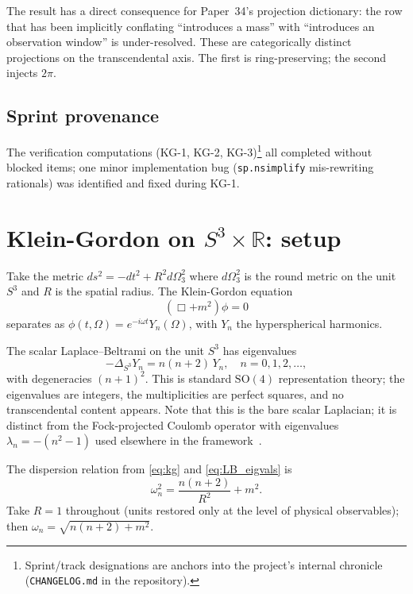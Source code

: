 \documentclass[11pt]{article}
\begin{document}
The result has a direct consequence for Paper~34's projection
dictionary: the row that has been implicitly conflating ``introduces a
mass'' with ``introduces an observation window'' is under-resolved.
These are categorically distinct projections on the transcendental
axis.  The first is ring-preserving; the second injects $2\pi$.

\subsection*{Sprint provenance}
The verification computations (KG-1, KG-2,
KG-3)\footnote{Sprint/track designations are anchors into the
project's internal chronicle (\texttt{CHANGELOG.md} in the
repository).} all completed without
blocked items; one minor implementation bug (\texttt{sp.nsimplify}
mis-rewriting rationals) was identified and fixed during KG-1.

\section{Klein-Gordon on $S^3 \times \mathbb{R}$: setup}
\label{sec:setup}

Take the metric $ds^2 = -dt^2 + R^2 d\Omega^2_3$ where $d\Omega^2_3$
is the round metric on the unit $S^3$ and $R$ is the spatial radius.
The Klein-Gordon equation
\begin{equation}
\label{eq:kg}
(\Box + m^2)\phi = 0
\end{equation}
separates as $\phi(t, \Omega) = e^{-i\omega t} Y_n(\Omega)$, with
$Y_n$ the hyperspherical harmonics.

The scalar Laplace--Beltrami on the unit $S^3$ has eigenvalues
\begin{equation}
\label{eq:LB_eigvals}
-\Delta_{S^3} Y_n = n(n+2) \, Y_n,
\quad n = 0, 1, 2, \ldots,
\end{equation}
with degeneracies $(n+1)^2$.  This is standard $\mathrm{SO}(4)$
representation theory; the eigenvalues are integers, the multiplicities
are perfect squares, and no transcendental content appears.  Note that
this is the bare scalar Laplacian; it is distinct from the Fock-projected
Coulomb operator with eigenvalues $\lambda_n = -(n^2 - 1)$ used elsewhere
in the framework~\cite{paper7}.

The dispersion relation from \eqref{eq:kg} and \eqref{eq:LB_eigvals} is
\begin{equation}
\label{eq:dispersion}
\omega_n^2 = \frac{n(n+2)}{R^2} + m^2.
\end{equation}
Take $R = 1$ throughout (units restored only at the level of physical
observables); then $\omega_n = \sqrt{n(n+2) + m^2}$.
\end{document}
